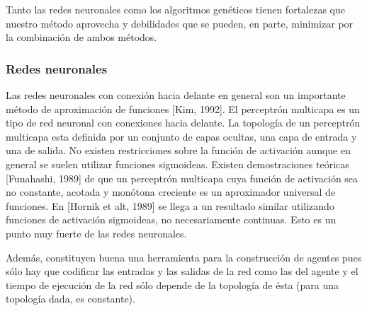 \documentclass[a4paper,11pt]{article}
\begin{document}
 Tanto las redes neuronales como los algoritmos gen\'eticos tienen fortalezas que nuestro m\'etodo aprovecha y debilidades que se pueden, en parte, minimizar por la combinaci\'on de ambos m\'etodos.

\subsubsection{Redes neuronales}\label{anaFortYDebRedes}

 Las redes neuronales con conexi\'on hacia delante en general son un importante m\'etodo de aproximaci\'on de funciones [Kim, 1992]. El perceptr\'on multicapa es un tipo de red neuronal con conexiones hacia delante. La topolog\'ia de un perceptr\'on multicapa esta definida por un conjunto de capas ocultas, una capa de entrada y una de salida. No existen restricciones sobre la funci\'on de activaci\'on aunque en general se suelen utilizar funciones sigmoideas. Existen demostraciones te\'oricas [Funahashi, 1989] de que un perceptr\'on multicapa cuya funci\'on de activaci\'on sea no constante, acotada y mon\'otona creciente es un aproximador universal de funciones. En [Hornik et alt, 1989] se llega a un resultado similar utilizando funciones de activaci\'on sigmoideas, no necesariamente continuas. Esto es un punto muy fuerte de las redes neuronales. 

 Adem\'as, constituyen buena una herramienta para la construcci\'on de agentes pues s\'olo hay que codificar las entradas y las salidas de la red como las del agente y el tiempo de ejecuci\'on de la red s\'olo depende de la topolog\'ia de \'esta (para una topolog\'ia dada, es constante).
\end{document}
